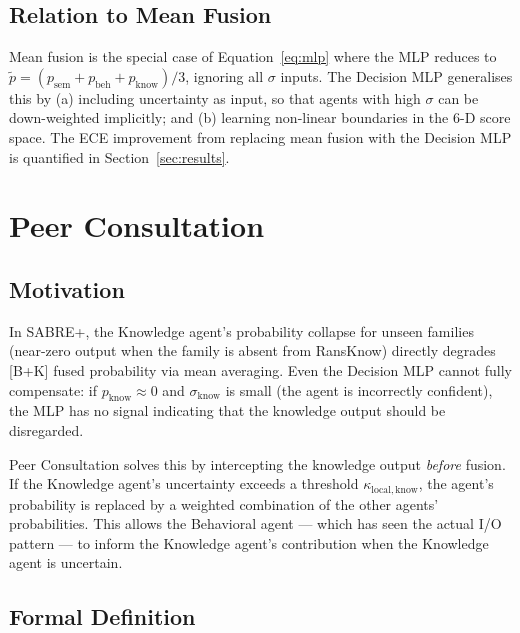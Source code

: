 \documentclass[journal]{IEEEtran}
\newcommand{\sem}{\mathrm{sem}}
\newcommand{\beh}{\mathrm{beh}}
\newcommand{\know}{\mathrm{know}}
\newcommand{\pfused}{\tilde{p}}
\begin{document}
\subsection{Relation to Mean Fusion}

Mean fusion is the special case of Equation~\eqref{eq:mlp} where the
MLP reduces to $\pfused = (p_{\sem} + p_{\beh} + p_{\know}) / 3$,
ignoring all $\sigma$ inputs.
The Decision MLP generalises this by (a) including uncertainty as input,
so that agents with high $\sigma$ can be down-weighted implicitly; and
(b) learning non-linear boundaries in the 6-D score space.
The ECE improvement from replacing mean fusion with the Decision MLP
is quantified in Section~\ref{sec:results}.


\section{Peer Consultation}
\label{sec:consultation}

\subsection{Motivation}

In SABRE+, the Knowledge agent's probability collapse for unseen families
(near-zero output when the family is absent from RansKnow) directly
degrades [B+K] fused probability via mean averaging.
Even the Decision MLP cannot fully compensate: if $p_{\know} \approx 0$
and $\sigma_{\know}$ is small (the agent is incorrectly confident), the
MLP has no signal indicating that the knowledge output should be
disregarded.

Peer Consultation solves this by intercepting the knowledge output
\emph{before} fusion.
If the Knowledge agent's uncertainty exceeds a threshold
$\kappa_{\mathrm{local},\know}$, the agent's probability is replaced by
a weighted combination of the other agents' probabilities.
This allows the Behavioral agent --- which has seen the actual I/O
pattern --- to inform the Knowledge agent's contribution when the
Knowledge agent is uncertain.

\subsection{Formal Definition}
\end{document}
